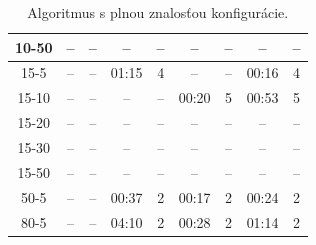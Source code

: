 \documentclass[
  printed, %
  oneside, %
  notable,   %
  nolof,     %
  nolot,     %
]{fithesis3}
\begin{document}
\begin{table}[hp!]
\begin{tabular}{c|cc|cc|cc|cc}
10-50  & -- & -- & -- & -- & -- & -- & -- & -- \\ \hline
15-5  & -- & -- & 01:15 & 4 & -- & -- & \cellcolor{table-green}00:16 & \cellcolor{table-green}4 \\
15-10  & -- & -- & -- & -- & \cellcolor{table-green}00:20 & \cellcolor{table-green}5 & 00:53 & 5 \\
15-20  & -- & -- & -- & -- & -- & -- & -- & -- \\
15-30  & -- & -- & -- & -- & -- & -- & -- & -- \\
15-50  & -- & -- & -- & -- & -- & -- & -- & -- \\ \hline
50-5  & -- & -- & 00:37 & 2 & \cellcolor{table-green}00:17 & \cellcolor{table-green}2 & 00:24 & 2 \\ \hline
80-5  & -- & -- & 04:10 & 2 & \cellcolor{table-green}00:28 & \cellcolor{table-green}2 & 01:14 & 2 \\ 
\end{tabular}%

\caption{Algoritmus s plnou znalosťou konfigurácie. }
\label{tab:algo1}
\end{table}
\end{document}
